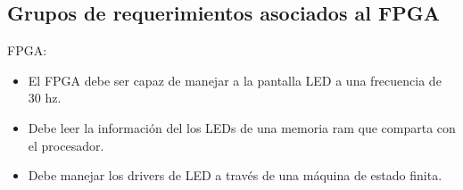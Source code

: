 \subsection{Grupos de requerimientos asociados al FPGA}
FPGA:
\begin{itemize}
\item El FPGA debe ser capaz de manejar a la pantalla LED a una frecuencia de  30 hz.
\item Debe leer la información del los LEDs de una memoria ram que comparta con el procesador.
\item Debe manejar los drivers de LED a través de una máquina de estado finita.   
\end{itemize}